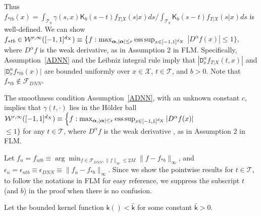 \documentclass[lettersize, 12pt]{article}
\begin{document}
Thus $f_{\ast t b}(x) = \int_{\mathcal{T}_0} \gamma(s,x) \mathsf{K}_b(s-t) f_{T|X}(s|x)ds\big/\int_{\mathcal{T}_0} \mathsf{K}_b(s-t) f_{T|X}(s|x)ds$ is well-defined.  
We can show $f_{\ast tb} \in \mathcal{W}^{r,\infty}([-1,1]^{d_X}) \equiv \big\{f: \max_{\bm{\alpha}, |\bm{\alpha}| \leq r}{\rm ess}\sup_{x\in[-1,1]^{d_X}}$ $ |D^\alpha f(x)| \leq 1\big\}$, where $D^\alpha f$ is the weak derivative, as in Assumption 2 in FLM.  
Specifically, Assumption~\ref{ADNN} and the Leibniz integral rule imply that $|\mathtt{D}_x^\alpha f_{T|X}(t,x)|$ and $|\mathtt{D}_x^\alpha f_{\ast tb}(x)|$ are bounded uniformly over $x\in\mathcal{X}$, $t\in\mathcal{T}$, and $b > 0$.
Note that $f_{\ast tb}\notin\mathcal{F}_{DNN}$.

The smoothness condition Assumption~\ref{ADNN}, with an unknown constant $c$,  
implies that $\gamma(t,\cdot)$ lies in the H\"{o}lder ball $\mathcal{W}^{r,\infty}([-1,1]^{d_X}) \equiv \Big\{f: \max_{\bm{\alpha}, |\bm{\alpha}| \leq r}{\rm ess}\sup_{x\in[-1,1]^{d_X}} |D^\alpha f(x)|$\\$ \leq 1\Big\}$
for any $t\in\mathcal{T}$, 
where $D^\alpha f$ is the weak derivative \citep{Yarotsky}, as in Assumption 2 in FLM.

Let $f_n = f_{ntb} \equiv  \arg\min_{f\in\mathcal{F}_{DNN}, \|f\|_\infty \leq 2M} \|f-f_{\ast b}\|_\infty$,
and $\epsilon_{n}  = \epsilon_{ntb} \equiv  \epsilon_{DNN} \equiv  \|f_n - f_{\ast b}\|_\infty$.
Since we show the pointwise results for $t\in\mathcal{T}$,  
to follow the notations in FLM for easy reference, we suppress the subscript $t$ (and $b$) in the proof when there is no confusion.

Let the bounded kernel function $\mathsf{k}() < \bar{\mathsf{k}}$ for some constant $\bar{\mathsf{k}} > 0$.
\end{document}

